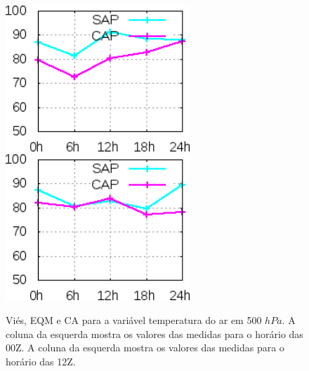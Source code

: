 \begin{figure}[!hbp]
\includegraphics[height=5.5cm]{./figs/CA500temp0Z.png}\includegraphics[height=5.5cm]{./figs/CA500temp12Z.png}
\caption{Viés, EQM e CA para a variável temperatura do ar em 500 $hPa$. A coluna da esquerda mostra os valores das medidas para o horário das 00Z. A coluna da esquerda mostra os valores das medidas para o horário das 12Z.}
\label{fig56}
\end{figure}


